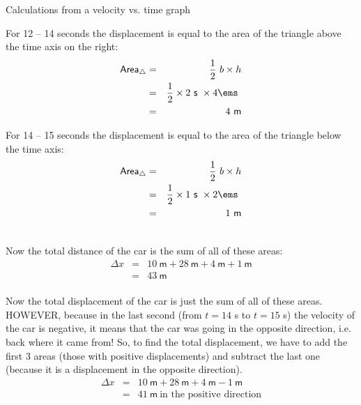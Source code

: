 \begin{wex}{Calculations from a velocity vs. time graph}
{\begin{minipage}{0.4\textwidth}
For 12 -- 14 seconds the displacement is equal to the area of the triangle above the time axis on the right:
\begin{eqnarray*}
\mathsf{Area}_{\triangle} &=& \frac{1}{2}~b \times h\\
&=& \frac{1}{2} \times 2\mathsf{~s}\ \times 4 \ems \ \\
&=&4\ \mathsf{m}\\
\end{eqnarray*}
\end{minipage}
\begin{minipage}{0.05\textwidth}
\begin{center}
\end{center}
\end{minipage}
\begin{minipage}{0.4\textwidth}
For 14 -- 15 seconds the displacement is equal to the area of the triangle below the time axis:
\begin{eqnarray*}
\mathsf{Area}_{\triangle} &=& \frac{1}{2}~b \times h\\
&=& \frac{1}{2} \times 1\mathsf{~s}\ \times 2 \ems\ \\
&=&1\ \mathsf{m}\\
\end{eqnarray*}
\end{minipage}
\\
Now the total distance of the car is the sum of all of these areas:
\begin{eqnarray*}
\Delta x&=&10\mathsf{~m} + 28\mathsf{~m} + 4\mathsf{~m} + 1\mathsf{~m}\\
&=&43\ \mathsf{m}
\end{eqnarray*}
\\
Now the total displacement of the car is just the sum of all of these areas. HOWEVER, because in the last second (from $t=14$ s to $t=15$ s) the velocity of the car is negative, it means that the car was going in the opposite direction, i.e. back where it came from! So, to find the total displacement, we have to add the first 3 areas (those with positive displacements) and subtract the last one (because it is a displacement in the opposite direction).
\begin{eqnarray*}
\Delta x&=&10\mathsf{~m} +28\mathsf{~m} +4\mathsf{~m} -1\mathsf{~m}\\
&=&41\ \mathsf{m}\ \mbox{in the positive direction}
\end{eqnarray*}}
\end{wex}
